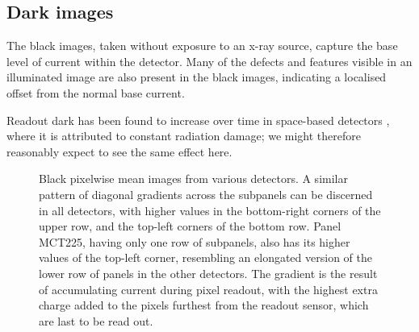 \documentclass[\main/IO-Pixels.tex]{subfiles}
\begin{document}

\subsection{Dark images}

The black images, taken without exposure to an x-ray source, capture the base level of current within the detector. Many of the defects and features visible in an illuminated image are also present in the black images, indicating a localised offset from the normal base current.

Readout dark has been found to increase over time in space-based detectors , where it is attributed to constant radiation damage; we might therefore reasonably expect to see the same effect here.

\begin{figure}
\caption{Black pixelwise mean images from various detectors. A similar pattern of diagonal gradients across the subpanels can be discerned in all detectors, with higher values in the bottom-right corners of the upper row, and the top-left corners of the bottom row. Panel MCT225, having only one row of subpanels, also has its higher values of the top-left corner, resembling an elongated version of the lower row of panels in the other detectors. The gradient is the result of accumulating current during pixel readout, with the highest extra charge added to the pixels furthest from the readout sensor, which are last to be read out.}

%
%
%
%

\end{figure}
\end{document}
